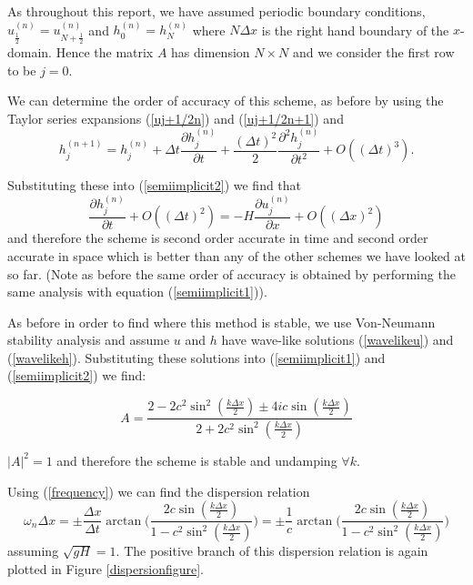 \documentclass[a4paper,12pt, notitlepage]{article}
\begin{document}
As throughout this report, we have assumed periodic boundary conditions, $u_{\frac{1}{2}}^{(n)} = u_{N + \frac{1}{2}}^{(n)}$ and $h_{0}^{(n)} = h_{N}^{(n)}$ where $N\Delta x$ is the right hand boundary of the $x$-domain. Hence the matrix $A$ has dimension $N \times N$ and we consider the first row to be $j = 0$.

We can determine the order of accuracy of this scheme, as before by using the Taylor series expansions (\ref{uj+1/2n}) and (\ref{uj+1/2n+1}) and
\begin{equation}
h_{j}^{(n+ 1)} = h_{j}^{(n)} + \Delta t \frac{\partial h_{j}^{(n)}}{\partial t} + \frac{(\Delta t)^{2}}{2}\frac{\partial^{2} h_{j}^{(n)}}{\partial t^{2}} + O((\Delta t)^{3}).
\end{equation}

Substituting these into (\ref{semiimplicit2}) we find that
\begin{equation}
\frac{\partial h_{j}^{(n)}}{\partial t} + O((\Delta t)^{2}) = - H \frac{\partial u_{j}^{(n)}}{\partial x} + O((\Delta x)^{2}) 
\end{equation}
and therefore the scheme is second order accurate in time and second order accurate in space which is better than any of the other schemes we have looked at so far. (Note as before the same order of accuracy is obtained by performing the same analysis with equation (\ref{semiimplicit1})).

As before in order to find where this method is stable, we use Von-Neumann stability analysis and assume $u$ and $h$ have wave-like solutions (\ref{wavelikeu}) and (\ref{wavelikeh}). Substituting these solutions into (\ref{semiimplicit1}) and (\ref{semiimplicit2}) we find:

\begin{equation}
A = \frac{2 - 2c^{2}\sin^{2}(\frac{k\Delta x}{2}) \pm 4ic\sin(\frac{k\Delta x}{2})}{2 + 2 c^{2}\sin^{2}(\frac{k\Delta x}{2})}
\end{equation}

$\lvert A \rvert^{2} = 1$ and therefore the scheme is stable and undamping $\forall k$.

Using (\ref{frequency}) we can find the dispersion relation
\begin{equation}
\omega_{n} \Delta x = \pm\frac{\Delta x}{\Delta t} \arctan\bigg(\frac{2 c \sin(\frac{k\Delta x}{2})}{1 - c^{2} \sin^{2}(\frac{k\Delta x}{2})}\bigg) = \pm\frac{1}{c} \arctan\bigg(\frac{2 c \sin(\frac{k\Delta x}{2})}{1 - c^{2} \sin^{2}(\frac{k\Delta x}{2})}\bigg)
\end{equation}
assuming $\sqrt{gH} = 1$. The positive branch of this dispersion relation is again plotted in Figure \ref{dispersionfigure}. 
\end{document}
